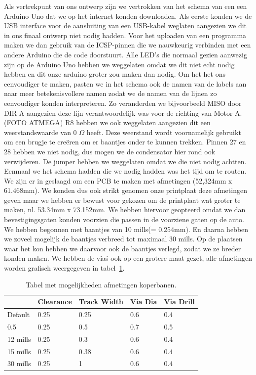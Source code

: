 Als vertrekpunt van ons ontwerp zijn we vertrokken van het schema van een een Arduino Uno dat we op het internet konden downloaden. Als eerste konden we de USB interface voor de aansluiting van een USB-kabel weglaten aangezien we dit in ons finaal ontwerp niet nodig hadden. Voor het uploaden van een programma maken we dan gebruik van de ICSP-pinnen die we nauwkeurig verbinden met een andere Arduino die de code doorstuurt.  Alle LED's die normaal gezien aanwezig zijn op de Arduino Uno hebben we  weggelaten omdat we dit niet echt nodig hebben en dit onze arduino groter zou maken dan nodig. Om het het ons eenvoudiger te maken, pasten we in het schema ook de namen van de labels aan naar meer betekenisvollere namen zodat we de namen van de lijnen zo eenvoudiger konden interpreteren. Zo veranderden we bijvoorbeeld MISO door DIR A aangezien deze lijn verantwoordelijk was voor de richting van Motor A. (FOTO ATMEGA) R8 hebben we ook weggelaten aangezien dit een weerstandswaarde van 0 $\Omega$ heeft. Deze weerstand wordt voornamelijk gebruikt om een brugje te cre\"eren om er baantjes onder te kunnen trekken. Pinnen 27 en 28 hebben we niet nodig, dus mogen we de condensator hier rond ook verwijderen. De jumper hebben we weggelaten omdat we die niet nodig achtten. Eenmaal we het schema hadden die we nodig hadden was het tijd om te routen. We zijn er in geslaagd om een PCB te maken met afmetingen (52,324mm x 61.468mm). We konden dus ook strikt genomen onze printplaat deze afmetingen geven maar we hebben er bewust voor gekozen om de printplaat wat groter te maken, nl.  53.34mm x 73.152mm. We hebben hiervoor geopteerd omdat we dan bevestigingsgaten konden voorzien die passen in de voorziene gaten op de auto. We hebben begonnen met baantjes van 10 mills(= 0.254mm). En daarna hebben we zoveel mogelijk de baantjes verbreed tot maximaal 30 mills. Op de plaatsen waar het kon hebben we daarvoor ook de baantjes verlegd, zodat we ze breder konden maken. We hebben de via\'s ook op een grotere maat gezet, alle afmetingen worden grafisch weergegeven in tabel~\ref{table:afmetingen}.\\
\begin {table}[H]
\caption {Tabel met mogelijkheden afmetingen koperbanen.} \label{table:afmetingen}
	\begin{center}
	\begin{tabular}{ | l | l | l | l | l |}
	\hline
	  & Clearance & Track Width & Via Dia & Via Drill\\ \hline
	Default & 0.25 & 0.25 & 0.6 & 0.4\\ \hline
	0.5 & 0.25 & 0.5 & 0.7 & 0.5 \\ \hline
	12 mills & 0.25 & 0.3 & 0.6 & 0.4 \\ \hline
	15 mills & 0.25 & 0.38 & 0.6 & 0.4 \\ \hline
	30 mills & 0.25 & 1 & 0.6 & 0.4 \\ \hline
	\end{tabular}
	\end{center}
\end{table}
